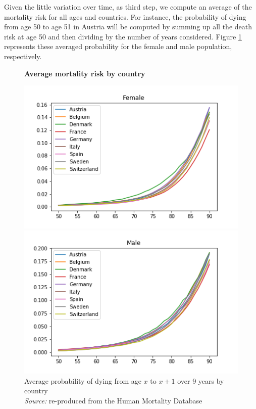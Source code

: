 Given the little variation over time, as third step, we compute an average of the mortality risk for all ages and countries.
For instance, the probability of dying from age 50 to age 51 in Austria will be computed by summing up all the death risk at age 50 and then dividing by the number of years considered. Figure \ref{fig:averages_0} represents these averaged probability for the female and male population, respectively. \\



\begin{figure}[H]
    \centering \textbf{Average mortality risk by country}\par\medskip
    \begin{minipage}{.5\textwidth}
        \centering
        \includegraphics[scale=.5]{images/Average_mortality_female.png}
    \end{minipage}%
   \begin{minipage}{.5\textwidth}
        \centering
       \includegraphics[scale=.5]{images/Average_mortality_male.png}
    \end{minipage}
      \captionsetup{justification=centering}
    \caption{Average probability of dying from age $x$ to $x+1$   over 9 years by country \\ \textit{Source:} re-produced from the Human Mortality Database }
    \label{fig:averages_0}
\end{figure}

